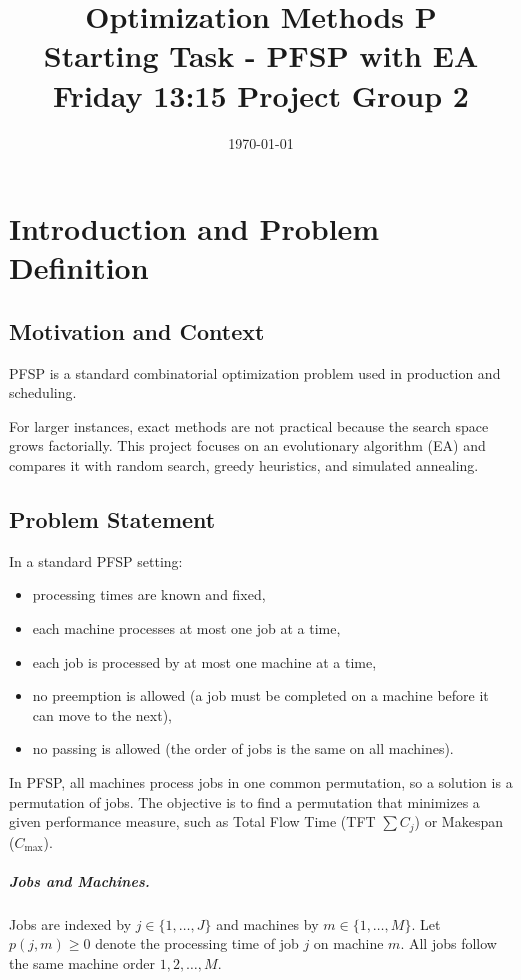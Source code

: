 \documentclass[12pt,a4paper]{report}
\title{Optimization Methods P\\ Starting Task - PFSP with EA \\ Friday 13:15 Project Group 2}
\author{\reportauthor}
\date{\today}
\begin{document}
\maketitle
\tableofcontents
\clearpage

\chapter{Introduction and Problem Definition}
\section{Motivation and Context}
PFSP is a standard combinatorial optimization problem used in production and scheduling.

For larger instances, exact methods are not practical because the search space grows factorially. This project focuses on an evolutionary algorithm (EA) and compares it with random search, greedy heuristics, and simulated annealing.

\section{Problem Statement}
In a standard PFSP setting:
\begin{itemize}
	\item processing times are known and fixed,
	\item each machine processes at most one job at a time,
	\item each job is processed by at most one machine at a time,
	\item no preemption is allowed (a job must be completed on a machine before it can move to the next),
    \item no passing is allowed (the order of jobs is the same on all machines).
\end{itemize}

In PFSP, all machines process jobs in one common permutation, so a solution is a permutation of jobs. The objective is to find a permutation that minimizes a given performance measure, such as Total Flow Time (TFT \(\sum C_j\)) or Makespan (\(C_{\max}\)).

\paragraph{Jobs and Machines.}
Jobs are indexed by $j\in \{1,\ldots,J\}$ and machines by $m\in \{1,\ldots,M\}$. Let $p(j,m)\ge 0$ denote the processing time of job $j$ on machine $m$. All jobs follow the same machine order $1,2,\ldots,M$.
\end{document}

